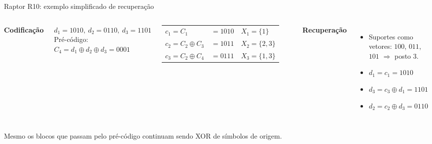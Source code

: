 \documentclass[aspectratio=169,10pt]{beamer}
\begin{document}
\begin{frame}{Raptor R10: exemplo simplificado de recuperação}
	\begin{columns}[T, onlytextwidth]
		\textbf{Codificação}
		\par\vspace{0.4em}
		$d_1 = 1010,\ d_2 = 0110,\ d_3 = 1101$\\
		Pré-código: $C_4 = d_1 \oplus d_2 \oplus d_3 = 0001$
		\par\vspace{0.6em}
		\renewcommand{\arraystretch}{1.25}
		\begin{tabular}{@{}lll@{}}
			$c_1 = C_1$ & $= 1010$ & $X_1 = \{1\}$ \\
			$c_2 = C_2 \oplus C_3$ & $= 1011$ & $X_2 = \{2, 3\}$ \\
			$c_3 = C_2 \oplus C_4$ & $= 0111$ & $X_3 = \{1, 3\}$ \\
		\end{tabular}
		\textbf{Recuperação}
		\begin{itemize}\setlength{\itemsep}{0.4em}
			\item Suportes como vetores: $100$, $011$, $101$ $\Rightarrow$ \alert{posto 3}.
			\item $d_1 = c_1 = 1010$
			\item $d_3 = c_3 \oplus d_1 = 1101$
			\item $d_2 = c_2 \oplus d_3 = 0110$
		\end{itemize}
	\end{columns}
	\vfill
	\centering
	Mesmo os blocos que passam pelo pré-código continuam sendo \alert{XOR de símbolos de origem}.
\end{frame}
\end{document}
